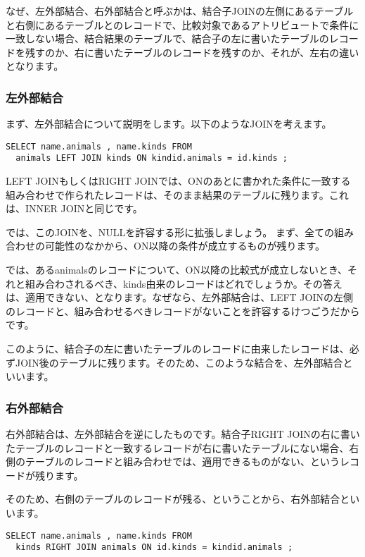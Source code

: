 なぜ、左外部結合、右外部結合と呼ぶかは、結合子JOINの左側にあるテーブルと右側にあるテーブルとのレコードで、比較対象であるアトリビュートで条件に一致しない場合、結合結果のテーブルで、結合子の左に書いたテーブルのレコードを残すのか、右に書いたテーブルのレコードを残すのか、それが、左右の違いとなります。

\subsubsection{左外部結合}

まず、左外部結合について説明をします。以下のようなJOINを考えます。

\begin{verbatim}
SELECT name.animals , name.kinds FROM
  animals LEFT JOIN kinds ON kindid.animals = id.kinds ;
\end{verbatim}

LEFT JOINもしくはRIGHT JOINでは、ONのあとに書かれた条件に一致する組み合わせで作られたレコードは、そのまま結果のテーブルに残ります。これは、INNER JOINと同じです。

では、このJOINを、NULLを許容する形に拡張しましょう。
まず、全ての組み合わせの可能性のなかから、ON以降の条件が成立するものが残ります。

では、あるanimalsのレコードについて、ON以降の比較式が成立しないとき、それと組み合わされるべき、kinds由来のレコードはどれでしょうか。その答えは、適用できない、となります。なぜなら、左外部結合は、LEFT JOINの左側のレコードと、組み合わせるべきレコードがないことを許容するけつごうだからです。

このように、結合子の左に書いたテーブルのレコードに由来したレコードは、必ずJOIN後のテーブルに残ります。そのため、このような結合を、左外部結合といいます。

\subsubsection{右外部結合}

右外部結合は、左外部結合を逆にしたものです。結合子RIGHT JOINの右に書いたテーブルのレコードと一致するレコードが右に書いたテーブルにない場合、右側のテーブルのレコードと組み合わせでは、適用できるものがない、というレコードが残ります。

そのため、右側のテーブルのレコードが残る、ということから、右外部結合といいます。

\begin{verbatim}
SELECT name.animals , name.kinds FROM
  kinds RIGHT JOIN animals ON id.kinds = kindid.animals ;
\end{verbatim}

